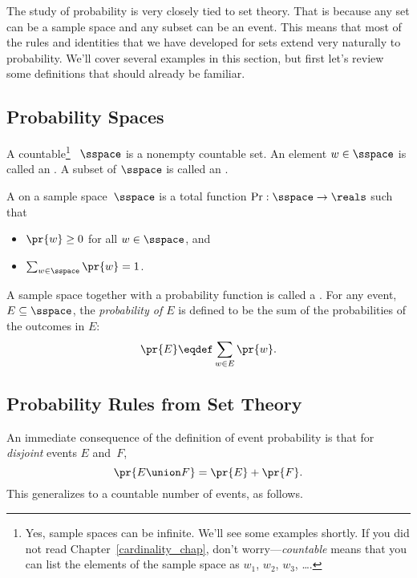 The study of probability is very closely tied to set theory.  That is
because any set can be a sample space and any subset can be an event.
This means that most of the rules and identities that we have
developed for sets extend very naturally to probability.  We'll cover
several examples in this section, but first let's review some
definitions that should already be familiar.

\subsection{Probability Spaces}

\begin{definition}\label{LN12:sampsp}
  A countable\footnote{Yes, sample spaces can be infinite.  We'll see
    some examples shortly.  If you did not read
    Chapter~\ref{cardinality_chap}, don't worry---\emph{countable}
    means that you can list the elements of the sample space as $w_1$,
    $w_2$, $w_3$, \dots.} ~$\sspace$ is a
  nonempty countable set.  An element $w \in \sspace$ is called an
  .  A subset of $\sspace$ is called an .
\end{definition}

\begin{definition}\label{LN12:probsp}
 A  on a sample space~$\sspace$ is a total
 function $\operatorname{Pr}: \sspace\to \reals$ such that
\begin{itemize}
\item $\pr{w} \geq 0$ for all $w \in \sspace$, and
\item $\sum_{w \in \sspace} \pr{w} = 1$.
\end{itemize}
A sample space together with a probability function is called a
.
For any event, $E \subseteq \sspace$, the 
\emph{probability of $E$} is defined to be the sum of the probabilities of
the outcomes in $E$:
\[
    \pr{E} \eqdef \sum_{w \in E} \pr{w}.
\]
\end{definition}

\subsection{Probability Rules from Set Theory}\label{sec:union_bound}

An immediate consequence of the definition of event probability is
that for \emph{disjoint} events $E$ and~$F$,
\[
    \pr{E \union F} = \pr{E} + \pr{F}.
\]
This generalizes to a countable number of events, as follows.

